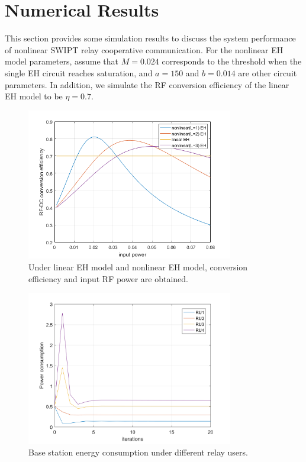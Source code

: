 \documentclass[conference]{IEEEtran}
\begin{document}
\section{Numerical Results}

This section provides some simulation results to discuss the system performance of nonlinear SWIPT relay cooperative communication. For the nonlinear EH model parameters, assume that $M=0.024$ corresponds to the threshold when the single EH circuit reaches saturation, and $a=150$ and $b=0.014$ are other circuit parameters. In addition, we simulate the RF conversion efficiency of the linear EH model to be $\eta=0.7$.



\begin{figure}[htbp]
\centerline{\includegraphics[width=9cm,keepaspectratio]{5.png}}
\caption{ Under linear EH model and nonlinear EH model, conversion efficiency and input RF power are obtained.}
\label{fig}
\end{figure}

\begin{figure}[htbp]
\centerline{\includegraphics[width=9cm,keepaspectratio]{power consumption.png}}
\caption{ Base station energy consumption under different relay users.}
\label{fig}
\end{figure}
\end{document}
